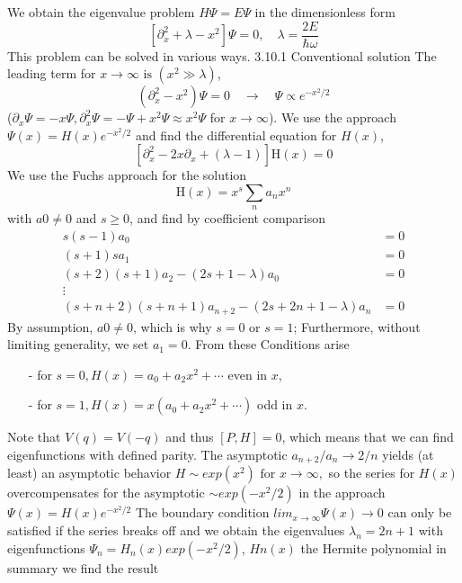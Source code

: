 We obtain the eigenvalue problem $H\Psi=E\Psi$ in the dimensionless form
\begin{equation}
    \left[\partial_{x}^{2}+\lambda-x^{2}\right] \Psi=0, \quad \lambda=\frac{2 E}{\hbar \omega}
    \end{equation}
This problem can be solved in various ways.
3.10.1 Conventional solution
The leading term for $x \to \infty \text{ is } (x^2 \gg \lambda)$,
\begin{equation}
    \left(\partial_{x}^{2}-x^{2}\right) \Psi=0 \quad \rightarrow \quad \Psi \propto e^{-x^{2} / 2}
    \end{equation}
($\partial_x\Psi=-x\Psi,\partial_x^2\Psi=-\Psi+x^2\Psi\approx x^2\Psi$ for $x\to\infty$). We use the approach $\Psi(x)=H(x)e^{-x^2/2}$ and find the differential equation for $H(x)$,
\begin{equation}
    \left[\partial_{x}^{2}-2 x \partial_{x}+(\lambda-1)\right] \mathrm{H}(x)=0
    \end{equation}
We use the Fuchs approach for the solution
\begin{equation}
    \mathrm{H}(x)=x^{s} \sum_{n} a_{n} x^{n}
    \end{equation}
with $a0 \neq 0$ and $s \geq 0$, and find by coefficient comparison
\begin{equation}
\begin{aligned} s(s-1) a_{0} &=0 \\(s+1) s a_{1} &=0 \\(s+2)(s+1)a_2-(2s+1-\lambda) a_{0} &=0 \\ \vdots &  \\(s+n+2)(s+n+1) a_{n+2}-(2 s+2 n+1-\lambda) a_{n} &=0 \end{aligned}
\end{equation}
By assumption, $a0 \neq 0$, which is why $s = 0$ or $s = 1$; Furthermore, without limiting generality, we set $a_1 = 0$. From these
Conditions arise
\begin{itemize}
    \item[-]  for $s = 0, H (x) = a_0 + a_2x
    ^2 + \cdots$ even in $x$,
    \item[-]  for $s = 1, H (x) = x (a_0 + a_2x
    ^2 + \cdots)$ odd in $x$.
\end{itemize}
Note that $ V (q) = V (-q)$ and thus $[P, H] = 0$, which means that we can find eigenfunctions with defined parity. The asymptotic $a_{n + 2} / a_n \to 2 / n$ yields (at least) an asymptotic behavior $H \sim exp (x^2) \text{ for } x\to\infty,$ so the series for $H (x)$ overcompensates for the asymptotic $\sim exp (-x^2 / 2)$ in the approach $\Psi (x ) = H (x) e^{-x^ 2/2}$ The boundary condition $lim_{x \to\infty}\Psi (x) \to 0$ can only be satisfied if the series breaks off and we obtain the eigenvalues $​​λ_n = 2n + 1$ with eigenfunctions $\Psi_n = H_n (x ) exp (-x^2 / 2)$, $Hn (x)$ the Hermite polynomial in summary we find the result

